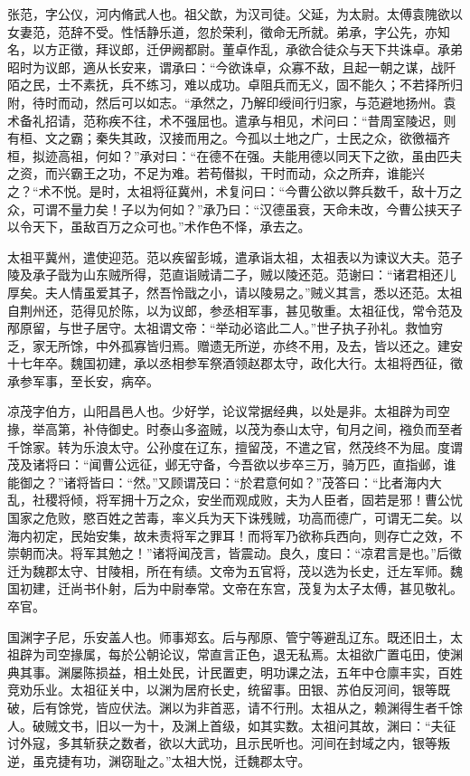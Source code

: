 \documentclass[12pt,UTF8]{ctexbook}
\begin{document}
张范，字公仪，河内脩武人也。祖父歆，为汉司徒。父延，为太尉。太傅袁隗欲以女妻范，范辞不受。性恬静乐道，忽於荣利，徵命无所就。弟承，字公先，亦知名，以方正徵，拜议郎，迁伊阙都尉。董卓作乱，承欲合徒众与天下共诛卓。承弟昭时为议郎，適从长安来，谓承曰：“今欲诛卓，众寡不敌，且起一朝之谋，战阡陌之民，士不素抚，兵不练习，难以成功。卓阻兵而无义，固不能久；不若择所归附，待时而动，然后可以如志。“承然之，乃解印绶间行归家，与范避地扬州。袁术备礼招请，范称疾不往，术不强屈也。遣承与相见，术问曰：“昔周室陵迟，则有桓、文之霸；秦失其政，汉接而用之。今孤以土地之广，士民之众，欲徼福齐桓，拟迹高祖，何如？”承对曰：“在德不在强。夫能用德以同天下之欲，虽由匹夫之资，而兴霸王之功，不足为难。若苟僣拟，干时而动，众之所弃，谁能兴之？“术不悦。是时，太祖将征冀州，术复问曰：“今曹公欲以弊兵数千，敌十万之众，可谓不量力矣！子以为何如？”承乃曰：“汉德虽衰，天命未改，今曹公挟天子以令天下，虽敌百万之众可也。”术作色不怿，承去之。

太祖平冀州，遣使迎范。范以疾留彭城，遣承诣太祖，太祖表以为谏议大夫。范子陵及承子戩为山东贼所得，范直诣贼请二子，贼以陵还范。范谢曰：“诸君相还儿厚矣。夫人情虽爱其子，然吾怜戩之小，请以陵易之。”贼义其言，悉以还范。太祖自荆州还，范得见於陈，以为议郎，参丞相军事，甚见敬重。太祖征伐，常令范及邴原留，与世子居守。太祖谓文帝：“举动必谘此二人。”世子执子孙礼。救恤穷乏，家无所馀，中外孤寡皆归焉。赠遗无所逆，亦终不用，及去，皆以还之。建安十七年卒。魏国初建，承以丞相参军祭酒领赵郡太守，政化大行。太祖将西征，徵承参军事，至长安，病卒。

凉茂字伯方，山阳昌邑人也。少好学，论议常据经典，以处是非。太祖辟为司空掾，举高第，补侍御史。时泰山多盗贼，以茂为泰山太守，旬月之间，襁负而至者千馀家。转为乐浪太守。公孙度在辽东，擅留茂，不遣之官，然茂终不为屈。度谓茂及诸将曰：“闻曹公远征，邺无守备，今吾欲以步卒三万，骑万匹，直指邺，谁能御之？”诸将皆曰：“然。”又顾谓茂曰：“於君意何如？”茂答曰：“比者海内大乱，社稷将倾，将军拥十万之众，安坐而观成败，夫为人臣者，固若是邪！曹公忧国家之危败，愍百姓之苦毒，率义兵为天下诛残贼，功高而德广，可谓无二矣。以海内初定，民始安集，故未责将军之罪耳！而将军乃欲称兵西向，则存亡之效，不崇朝而决。将军其勉之！”诸将闻茂言，皆震动。良久，度曰：“凉君言是也。”后徵迁为魏郡太守、甘陵相，所在有绩。文帝为五官将，茂以选为长史，迁左军师。魏国初建，迁尚书仆射，后为中尉奉常。文帝在东宫，茂复为太子太傅，甚见敬礼。卒官。

国渊字子尼，乐安盖人也。师事郑玄。后与邴原、管宁等避乱辽东。既还旧土，太祖辟为司空掾属，每於公朝论议，常直言正色，退无私焉。太祖欲广置屯田，使渊典其事。渊屡陈损益，相土处民，计民置吏，明功课之法，五年中仓廪丰实，百姓竞劝乐业。太祖征关中，以渊为居府长史，统留事。田银、苏伯反河间，银等既破，后有馀党，皆应伏法。渊以为非首恶，请不行刑。太祖从之，赖渊得生者千馀人。破贼文书，旧以一为十，及渊上首级，如其实数。太祖问其故，渊曰：“夫征讨外寇，多其斩获之数者，欲以大武功，且示民听也。河间在封域之内，银等叛逆，虽克捷有功，渊窃耻之。”太祖大悦，迁魏郡太守。
\end{document}
